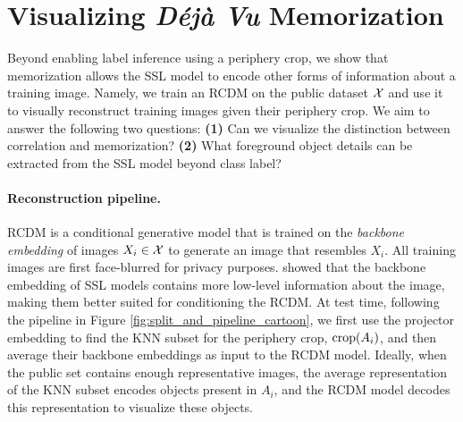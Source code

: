 \section{Visualizing \emph{Déjà Vu} Memorization}
\label{sec:visualizing}
Beyond enabling label inference using a periphery crop, we show that \dejavu memorization allows the SSL model to encode other forms of information about a training image. Namely, we train an RCDM \citep{RCDM} on the public dataset $\mathcal{X}$ and use it to visually reconstruct training images given their periphery crop.
We aim to answer the following two questions: \textbf{(1)} Can we visualize the distinction between correlation and \dejavu memorization? \textbf{(2)} What foreground object details can be extracted from the SSL model beyond class label? 
\vspace{-0.5em}
\paragraph{Reconstruction pipeline.}
RCDM is a conditional generative model that is trained on the \emph{backbone embedding} of images $X_i \in \mathcal{X}$ to generate an image that resembles $X_i$. All training images are first face-blurred for privacy purposes. \citet{RCDM} showed that the backbone embedding of SSL models contains more low-level information about the image, making them better suited for conditioning the RCDM.
At test time, following the pipeline in Figure \ref{fig:split_and_pipeline_cartoon}, we first use the projector embedding to find the KNN subset for the periphery crop, $\mathrm{crop}({A_i})$, and then average their backbone embeddings as input to the RCDM model. Ideally, when the public set contains enough representative images, the average representation of the KNN subset encodes objects present in $A_i$, and the RCDM model decodes this representation to visualize these objects.
% 
%


